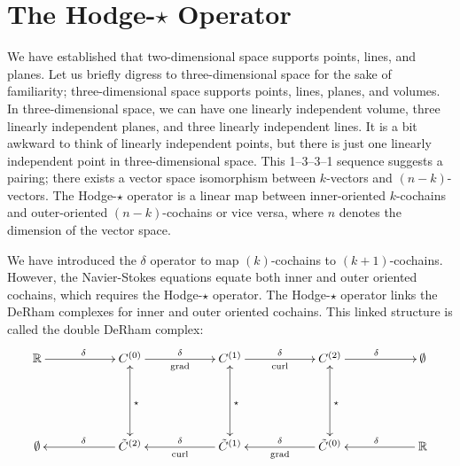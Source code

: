 \section{The Hodge-$\star$ Operator}

We have established that two-dimensional space supports points, lines, and planes. Let us briefly digress to three-dimensional space for the sake of familiarity; three-dimensional space supports points, lines, planes, and volumes. In three-dimensional space, we can have one linearly independent volume, three linearly independent planes, and three linearly independent lines. It is a bit awkward to think of linearly independent points, but there is just one linearly independent point in three-dimensional space. This 1--3--3--1 sequence suggests a pairing; there exists a vector space isomorphism between $k$-vectors and $(n-k)$-vectors. The Hodge-$\star$ operator is a linear map between inner-oriented $k$-cochains and outer-oriented $(n-k)$-cochains or vice versa, where $n$ denotes the dimension of the vector space.

We have introduced the $\delta$ operator to map $(k)$-cochains to $(k+1)$-cochains. However, the Navier-Stokes equations equate both inner and outer oriented cochains, which requires the Hodge-$\star$ operator. The Hodge-$\star$ operator links the DeRham complexes for inner and outer oriented cochains. This linked structure is called the double DeRham complex:
\begin{equation}
    \begin{gathered}
        \xymatrix@=13ex{
            \mathbb{R} \ar[r]^{\delta} & C^{(0)} \ar[r]^{\delta}_{\text{grad}} \ar@{<->}[d]^{\star} & C^{(1)} \ar[r]^{\delta}_{\text{curl}} \ar@{<->}[d]^{\star} & C^{(2)} \ar@{<->}[d]^{\star} \ar[r]^{\delta} & \emptyset \\
            \emptyset & \tilde{C}^{(2)} \ar[l]_{\delta} & \tilde{C}^{(1)} \ar[l]_{\delta}^{\text{curl}} & \tilde{C}^{(0)} \ar[l]_{\delta}^{\text{grad}} & \mathbb{R} \ar[l]_{\delta}
        }
    \end{gathered}
    \label{eq:doubleDeRham}
\end{equation}

